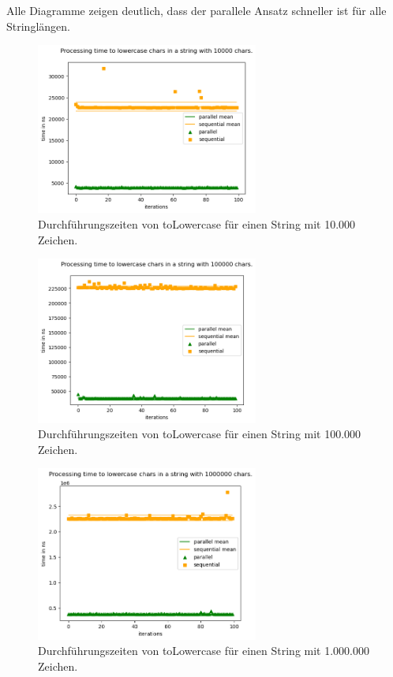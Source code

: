 \documentclass[plainarticle,zihtitle,german,final,hyperref,utf8]{zihpub}
\begin{document}
Alle Diagramme zeigen deutlich, dass der parallele Ansatz schneller ist für alle Stringlängen.
\begin{figure}[h]
	\begin{center}
		\includegraphics[width=0.65\textwidth]{images/comp_lower_10000.png}
		\caption{Durchführungszeiten von toLowercase für einen String mit 10.000 Zeichen.}
	\end{center}
\end{figure}
\begin{figure}[h]
	\begin{center}
		\includegraphics[width=0.65\textwidth]{images/comp_lower_100000.png}
		\caption{Durchführungszeiten von toLowercase für einen String mit 100.000 Zeichen.}
	\end{center}
\end{figure}
\begin{figure}[h]
	\begin{center}
		\includegraphics[width=0.65\textwidth]{images/comp_lower_1000000.png}
		\caption{Durchführungszeiten von toLowercase für einen String mit 1.000.000 Zeichen.}
	\end{center}
\end{figure}
\end{document}
